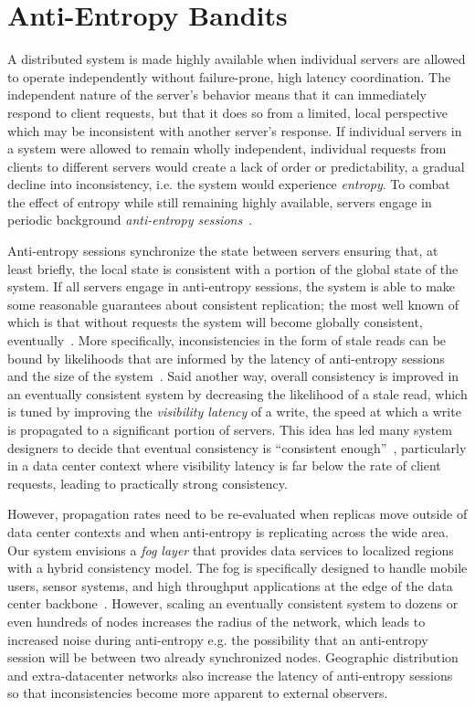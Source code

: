 \section{Anti-Entropy Bandits}
\label{ch06_anti_entropy_bandits}

A distributed system is made highly available when individual servers are
allowed to operate independently without failure-prone, high latency
coordination.
The independent nature of the server's behavior means that it can immediately
respond to client requests, but that it does so from a limited, local
perspective which may be inconsistent with another server's response.
If individual servers in a system were allowed to remain wholly independent,
individual requests from clients to different servers would create a lack of
order or predictability, a gradual decline into inconsistency, i.e. the
system would experience \textit{entropy}.
To combat the effect of entropy while still remaining highly available,
servers engage in periodic background \textit{anti-entropy
  sessions}~\cite{bayou}.

Anti-entropy sessions synchronize the state between servers ensuring that,
at least briefly, the local state is consistent with a portion of the global
state of the system.
If all servers engage in anti-entropy sessions, the system is able to make
some reasonable guarantees about consistent replication; the most well known
of which is that without requests the system will become
globally consistent, eventually~\cite{anti_entropy}.
More specifically, inconsistencies in the form of stale reads can be bound by
likelihoods that are informed by the latency of anti-entropy sessions and the
size of the system~\cite{probabilistically_bounded_staleness,quantifying_pbs}.
Said another way, overall consistency is improved in an eventually consistent
system by decreasing the likelihood of a stale read, which is tuned by
improving the \textit{visibility latency} of a write, the speed at which a
write is propagated to a significant portion of servers.
This idea has led many system designers to decide that eventual consistency
is ``consistent enough''~\cite{bermbach_eventual_2011,wada_data_2011},
particularly in a data center context where visibility latency is far below
the rate of client requests, leading to practically strong consistency.

However, propagation rates need to be re-evaluated when replicas move outside of data center contexts and when anti-entropy is replicating across the wide area.
Our system envisions a \emph{fog layer} that provides data services to localized regions with a hybrid consistency model.
The fog is specifically designed to handle mobile users, sensor systems, and high throughput applications at the edge of the data center backbone~\cite{edge_computing,geo_cdn}.
However, scaling an eventually consistent system to dozens or even hundreds
of nodes increases the radius of the network, which leads to increased noise
during anti-entropy e.g. the possibility that an anti-entropy session will be
between two already synchronized nodes.
Geographic distribution and extra-datacenter networks also increase the
latency of anti-entropy sessions so that inconsistencies become more apparent
to external observers.


